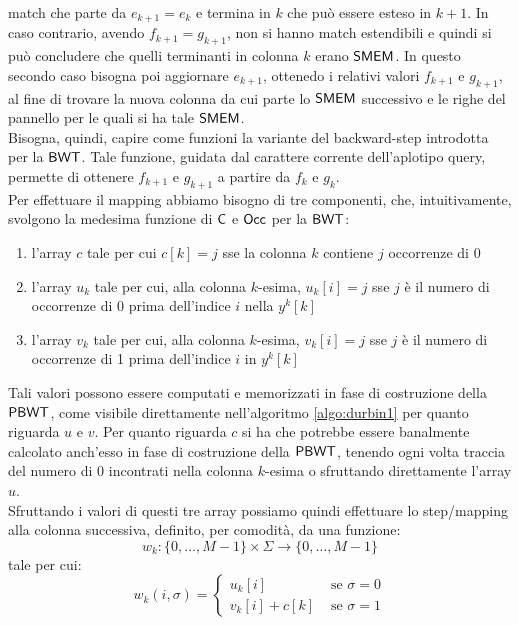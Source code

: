 match che parte da $e_{k+1}=e_{k}$ e termina in $k$ che può essere esteso in
$k+1$. In caso contrario, avendo $f_{k+1}=g_{k+1}$, non si hanno match
estendibili e quindi si può concludere che quelli terminanti in colonna $k$
erano $\mbox{\rm {\sf SMEM}}$. In questo secondo caso bisogna poi aggiornare $e_{k+1}$,
ottenedo i relativi valori $f_{k+1}$ e $g_{k+1}$, al fine di trovare la nuova
colonna da cui parte lo $\mbox{\rm {\sf SMEM}}$ successivo e le righe del pannello per le quali
si ha tale $\mbox{\rm {\sf SMEM}}$. \\
Bisogna, quindi, capire come funzioni la
variante del backward-step introdotta per la $\mbox{\rm {\sf BWT}}$. Tale funzione,
guidata dal carattere corrente dell'aplotipo query, permette di ottenere
$f_{k+1}$ e $g_{k+1}$ a partire da $f_k$ e $g_k$.\\ 
Per effettuare il mapping abbiamo bisogno di tre componenti, che,
intuitivamente, svolgono la medesima funzione di $\mbox{\rm {\sf C}}$ e $\mbox{\rm {\sf Occ}}$ per la
$\mbox{\rm {\sf BWT}}$: 
\begin{enumerate}
  \item l'array $c$ tale per cui $c[k]=j$ sse la colonna $k$ contiene $j$
  occorrenze di 0
  \item l'array $u_k$ tale per cui, alla colonna $k$-esima, $u_k[i]=j$ sse $j$ è
  il numero di occorrenze di 0 prima dell'indice $i$ nella $y^k[k]$ 
  \item l'array $v_k$ tale per cui, alla colonna $k$-esima, $v_k[i]=j$ sse $j$ è
  il numero di occorrenze di 1 prima dell'indice $i$ in $y^k[k]$ 
\end{enumerate}
Tali valori possono essere computati e memorizzati in fase di costruzione della
$\mbox{\rm {\sf PBWT}}$, come visibile direttamente nell'algoritmo \ref{algo:durbin1} per
quanto riguarda $u$ e $v$. Per quanto riguarda $c$
si ha che potrebbe essere banalmente calcolato anch'esso in fase di costruzione
della $\mbox{\rm {\sf PBWT}}$, tenendo ogni volta traccia del numero di 0 incontrati
nella colonna $k$-esima o sfruttando direttamente l'array $u$.\\
Sfruttando i valori di questi tre array possiamo quindi effettuare lo
step/mapping alla colonna successiva,
definito, per comodità, da una funzione:
\begin{equation}
  \label{eq:pbwtw1}
  w_k:\{0,\ldots,M-1\}\times\Sigma\to \{0,\ldots,M-1\}
\end{equation}
tale per cui:
\begin{equation}
  \label{eq:pbwtw2}
  w_k(i,\sigma)=
  \begin{cases}
    u_k[i]&\mbox{ se }\sigma=0\\
    v_k[i]+c[k]&\mbox{ se }\sigma=1
  \end{cases}
\end{equation}
